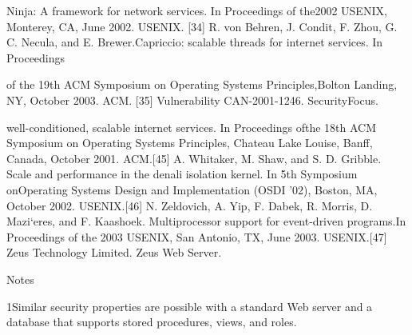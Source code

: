 Ninja: A framework for network services. In Proceedings of the2002 USENIX, Monterey, CA, June 2002. USENIX.
[34] R. von Behren, J. Condit, F. Zhou, G. C. Necula, and E. Brewer.Capriccio: scalable threads for internet services. In Proceedings

of the 19th ACM Symposium on Operating Systems Principles,Bolton Landing, NY, October 2003. ACM.
[35] Vulnerability CAN-2001-1246. SecurityFocus.

well-conditioned, scalable internet services. In Proceedings ofthe 18th ACM Symposium on Operating Systems Principles,
Chateau Lake Louise, Banff, Canada, October 2001. ACM.[45] A. Whitaker, M. Shaw, and S. D. Gribble. Scale and
performance in the denali isolation kernel. In 5th Symposium onOperating Systems Design and Implementation (OSDI '02),
Boston, MA, October 2002. USENIX.[46] N. Zeldovich, A. Yip, F. Dabek, R. Morris, D. Mazi`eres, and
F. Kaashoek. Multiprocessor support for event-driven programs.In Proceedings of the 2003 USENIX, San Antonio, TX, June
2003. USENIX.[47] Zeus Technology Limited. Zeus Web Server.

Notes

1Similar security properties are possible with a standard Web server
and a database that supports stored procedures, views, and roles.